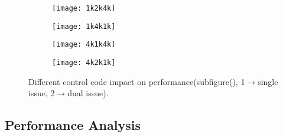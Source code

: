 \begin{figure*}
    \begin{subfigure}[htbp]{0.5\textwidth}
        \texttt{[image: 1k2k4k]}
        \subcaption{}
        \label{fig:control_throughput}
    \end{subfigure}
    \begin{subfigure}[htbp]{0.5\textwidth}
\begin{center}
        \texttt{[image: 1k4k1k]}
\end{center}
        \subcaption{}
        \label{fig:control_latency}
    \end{subfigure}
    \begin{subfigure}[htbp]{0.5\textwidth}
        \texttt{[image: 4k1k4k]}
        \subcaption{}
        \label{fig:control_pattern}
    \end{subfigure}
    \begin{subfigure}[htbp]{0.5\textwidth}
        \texttt{[image: 4k2k1k]}
        \subcaption{}
        \label{fig:control_pattern}
    \end{subfigure}
    \caption{Different control code impact on performance(subfigure(), 1$\rightarrow$single
    issue, 2$\rightarrow$dual issue).}
    \label{fig:control_code}
\end{figure*}

\subsection{Performance Analysis}

